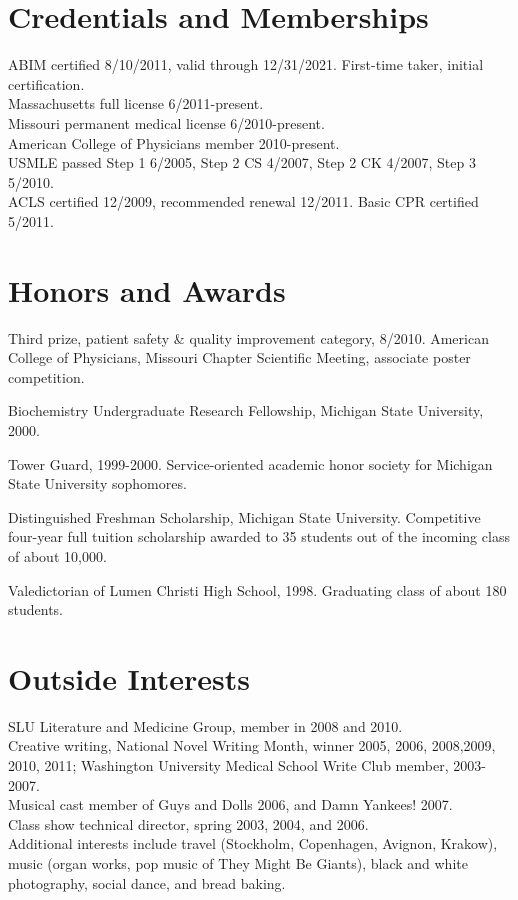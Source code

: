 \documentclass[11pt]{article}
\begin{document}
\section{Credentials and Memberships}

ABIM certified 8/10/2011, valid through 12/31/2021. First-time taker,
initial certification.\\
Massachusetts full license 6/2011-present.\\
Missouri permanent medical license 6/2010-present.\\
American College of Physicians member 2010-present.\\
USMLE passed Step 1 6/2005, Step 2 CS 4/2007, Step 2 CK 4/2007, Step 3
5/2010.\\
ACLS certified 12/2009, recommended renewal 12/2011. Basic CPR
certified 5/2011.\\

\section{Honors and Awards}

Third prize, patient safety \& quality improvement category, 8/2010.
American College of Physicians, Missouri Chapter Scientific Meeting,
associate poster competition.

Biochemistry Undergraduate Research Fellowship, Michigan State
University, 2000.

Tower Guard, 1999-2000. Service-oriented academic honor society for
Michigan State University sophomores.

Distinguished Freshman Scholarship, Michigan State University.
Competitive four-year full tuition scholarship awarded to 35 students
out of the incoming class of about 10,000.

Valedictorian of Lumen Christi High School, 1998. Graduating class of
about 180 students.

\section{Outside Interests}

SLU Literature and Medicine Group, member in 2008 and 2010.\\
Creative writing, National Novel Writing Month, winner 2005, 2006,
2008,2009, 2010, 2011; Washington University Medical School Write Club
member, 2003-2007.\\
Musical cast member of Guys and Dolls 2006, and Damn Yankees! 2007.\\
Class show technical director, spring 2003, 2004, and 2006.\\
Additional interests include travel (Stockholm, Copenhagen, Avignon,
Krakow), music (organ works, pop music of They Might Be Giants), black
and white photography, social dance, and bread baking.
\end{document}
